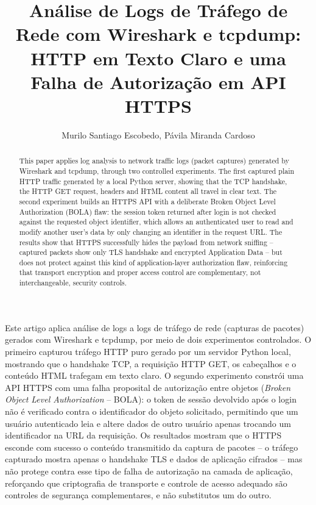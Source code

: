 \documentclass[12pt]{article}
\title{Análise de Logs de Tráfego de Rede com Wireshark e tcpdump:
  HTTP em Texto Claro e uma Falha de Autorização em API HTTPS}
\author{Murilo Santiago Escobedo\inst{1}, Pávila Miranda Cardoso\inst{1}}
\begin{document}
\maketitle

\begin{abstract}
This paper applies log analysis to network traffic logs (packet captures)
generated by Wireshark and tcpdump, through two controlled experiments.
The first captured plain HTTP traffic generated by a local Python server,
showing that the TCP handshake, the HTTP GET request, headers and HTML
content all travel in clear text. The second experiment builds an HTTPS
API with a deliberate Broken Object Level Authorization (BOLA) flaw: the
session token returned after login is not checked against the requested
object identifier, which allows an authenticated user to read and modify
another user's data by only changing an identifier in the request URL. The
results show that HTTPS successfully hides the payload from network
sniffing -- captured packets show only TLS handshake and encrypted
Application Data -- but does not protect against this kind of
application-layer authorization flaw, reinforcing that transport
encryption and proper access control are complementary, not
interchangeable, security controls.
\end{abstract}

\begin{resumo}
Este artigo aplica análise de logs a logs de tráfego de rede (capturas de
pacotes) gerados com Wireshark e tcpdump, por meio de dois experimentos
controlados. O primeiro capturou tráfego HTTP puro gerado por um servidor
Python local, mostrando que o handshake TCP, a requisição HTTP GET, os
cabeçalhos e o conteúdo HTML trafegam em texto claro. O segundo experimento
constrói uma API HTTPS com uma falha proposital de autorização entre
objetos (\textit{Broken Object Level Authorization} -- BOLA): o token de
sessão devolvido após o login não é verificado contra o identificador do
objeto solicitado, permitindo que um usuário autenticado leia e altere
dados de outro usuário apenas trocando um identificador na URL da
requisição. Os resultados mostram que o HTTPS esconde com sucesso o
conteúdo transmitido da captura de pacotes -- o tráfego capturado mostra
apenas o handshake TLS e dados de aplicação cifrados -- mas não protege
contra esse tipo de falha de autorização na camada de aplicação,
reforçando que criptografia de transporte e controle de acesso adequado
são controles de segurança complementares, e não substitutos um do outro.
\end{resumo}
\end{document}
